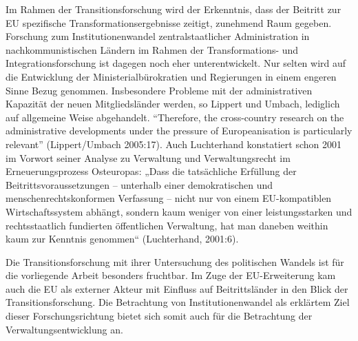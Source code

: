 Im Rahmen der Transitionsforschung wird der Erkenntnis, dass der Beitritt zur EU spezifische Transformationsergebnisse zeitigt, zunehmend Raum gegeben. Forschung zum Institutionenwandel zentralstaatlicher Administration in nachkommunistischen Ländern im Rahmen der Transformations- und Integrationsforschung ist dagegen noch eher unterentwickelt. Nur selten wird auf die Entwicklung der Ministerialbürokratien und Regierungen in einem engeren Sinne Bezug genommen. Insbesondere Probleme mit der administrativen Kapazität der neuen Mitgliedsländer werden, so Lippert und Umbach, lediglich auf allgemeine Weise abgehandelt. “Therefore, the cross-country research on the administrative developments under the pressure of Europeanisation is particularly relevant” (Lippert/Umbach 2005:17). Auch Luchterhand konstatiert schon 2001 im Vorwort seiner Analyse zu Verwaltung und Verwaltungsrecht im Erneuerungsprozess Osteuropas: „Dass die tatsächliche Erfüllung der Beitrittsvoraussetzungen – unterhalb einer demokratischen und menschenrechtskonformen Verfassung – nicht nur von einem EU-kompatiblen Wirtschaftssystem abhängt, sondern kaum weniger von einer leistungsstarken und rechtsstaatlich fundierten öffentlichen Verwaltung, hat man daneben weithin kaum zur Kenntnis genommen“ (Luchterhand, 2001:6).\par
Die Transitionsforschung mit ihrer Untersuchung des politischen Wandels ist für die vorliegende Arbeit besonders fruchtbar. Im Zuge der EU-Erweiterung kam auch die EU als externer Akteur mit Einfluss auf Beitrittsländer in den Blick der Transitionsforschung. Die Betrachtung von Institutionenwandel als erklärtem Ziel dieser Forschungsrichtung bietet sich somit auch für die Betrachtung der Verwaltungsentwicklung an. 
